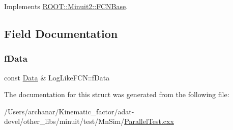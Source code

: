 Implements \mbox{\hyperlink{classROOT_1_1Minuit2_1_1FCNBase_a04ef08ddad92ce8d89d498efbe021c39}{R\+O\+O\+T\+::\+Minuit2\+::\+F\+C\+N\+Base}}.



\subsection{Field Documentation}
\mbox{\label{structLogLikeFCN_a1e75701ec502db469acee1c5d2d83a45}} 
\subsubsection{\texorpdfstring{fData}{fData}}
{\footnotesize\ttfamily const \mbox{\hyperlink{adat-devel_2other__libs_2minuit_2test_2MnSim_2ParallelTest_8cxx_a1766b42441c3f4d78bb2b56263a8e058}{Data}} \& Log\+Like\+F\+C\+N\+::f\+Data}



The documentation for this struct was generated from the following file\+:\begin{DoxyCompactItemize}
\item 
/\+Users/archanar/\+Kinematic\+\_\+factor/adat-\/devel/other\+\_\+libs/minuit/test/\+Mn\+Sim/\mbox{\hyperlink{adat-devel_2other__libs_2minuit_2test_2MnSim_2ParallelTest_8cxx}{Parallel\+Test.\+cxx}}\end{DoxyCompactItemize}

